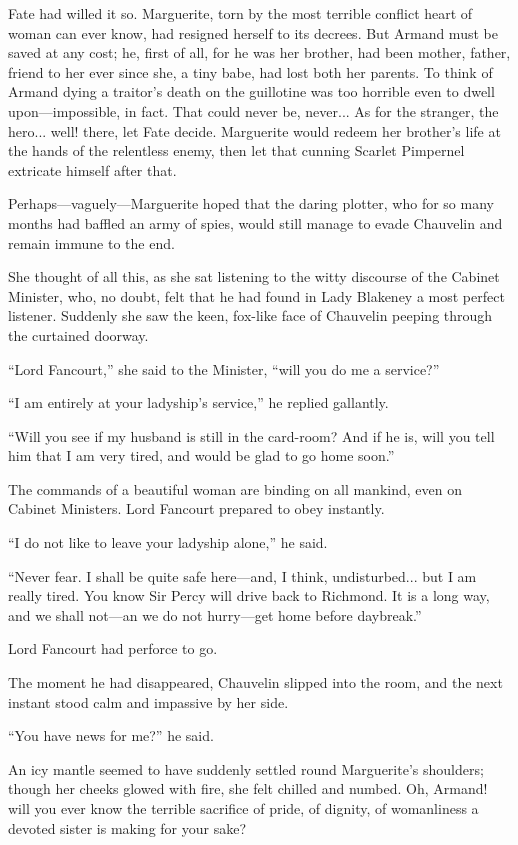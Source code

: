 Fate had willed it so. Marguerite, torn by the most terrible conflict heart of woman can ever know, had resigned herself to its decrees. But Armand must be saved at any cost; he, first of all, for he was her brother, had been mother, father, friend to her ever since she, a tiny babe, had lost both her parents. To think of Armand dying a traitor's death on the guillotine was too horrible even to dwell upon---impossible, in fact. That could never be, never... As for the stranger, the hero... well! there, let Fate decide. Marguerite would redeem her brother's life at the hands of the relentless enemy, then let that cunning Scarlet Pimpernel extricate himself after that.

Perhaps---vaguely---Marguerite hoped that the daring plotter, who for so many months had baffled an army of spies, would still manage to evade Chauvelin and remain immune to the end.

She thought of all this, as she sat listening to the witty discourse of the Cabinet Minister, who, no doubt, felt that he had found in Lady Blakeney a most perfect listener. Suddenly she saw the keen, fox-like face of Chauvelin peeping through the curtained doorway.

\enquote{Lord Fancourt,} she said to the Minister, \enquote{will you do me a service?}

\enquote{I am entirely at your ladyship's service,} he replied gallantly.

\enquote{Will you see if my husband is still in the card-room? And if he is, will you tell him that I am very tired, and would be glad to go home soon.}

The commands of a beautiful woman are binding on all mankind, even on Cabinet Ministers. Lord Fancourt prepared to obey instantly.

\enquote{I do not like to leave your ladyship alone,} he said.

\enquote{Never fear. I shall be quite safe here---and, I think, undisturbed... but I am really tired. You know Sir Percy will drive back to Richmond. It is a long way, and we shall not---an we do not hurry---get home before daybreak.}

Lord Fancourt had perforce to go.

The moment he had disappeared, Chauvelin slipped into the room, and the next instant stood calm and impassive by her side.

\enquote{You have news for me?} he said.

An icy mantle seemed to have suddenly settled round Marguerite's shoulders; though her cheeks glowed with fire, she felt chilled and numbed. Oh, Armand! will you ever know the terrible sacrifice of pride, of dignity, of womanliness a devoted sister is making for your sake?

